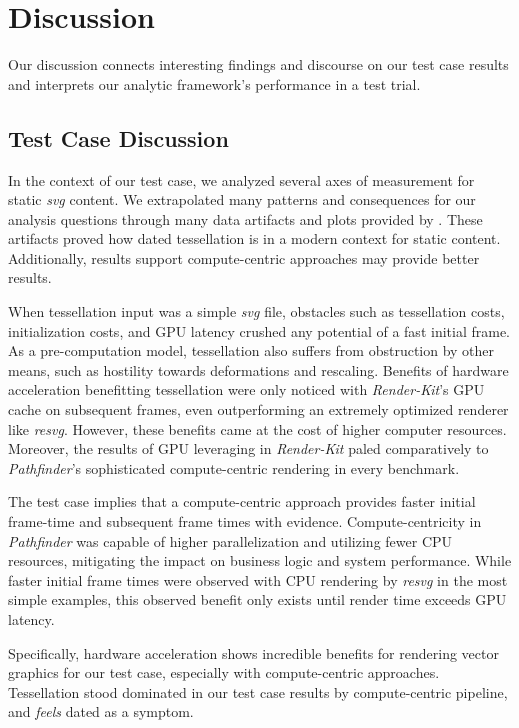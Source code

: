\section{Discussion}\label{sec:discussion}
Our discussion connects interesting findings and discourse on our test case results and interprets our analytic framework's performance in a test trial.

\subsection{Test Case Discussion}
In the context of our test case, we analyzed several axes of measurement for static \textit{svg} content. We extrapolated many patterns and consequences for our analysis questions through many data artifacts and plots provided by \toollinkedname. These artifacts proved how dated tessellation is in a modern context for static content. Additionally, results support compute-centric approaches may provide better results.\medskip

When tessellation input was a simple \textit{svg} file, obstacles such as tessellation costs, initialization costs, and GPU latency crushed any potential of a fast initial frame. As a pre-computation model, tessellation also suffers from obstruction by other means, such as hostility towards deformations and rescaling. Benefits of hardware acceleration benefitting tessellation were only noticed with \textit{Render-Kit}'s GPU cache on subsequent frames, even outperforming an extremely optimized renderer like \textit{resvg}. However, these benefits came at the cost of higher computer resources. Moreover, the results of GPU leveraging in \textit{Render-Kit} paled comparatively to \textit{Pathfinder}'s sophisticated compute-centric rendering in every benchmark.\medskip

The test case implies that a compute-centric approach provides faster initial frame-time and subsequent frame times with evidence. Compute-centricity in \textit{Pathfinder} was capable of higher parallelization and utilizing fewer CPU resources, mitigating the impact on business logic and system performance. While faster initial frame times were observed with CPU rendering by \textit{resvg} in the most simple examples, this observed benefit only exists until render time exceeds GPU latency.\medskip

Specifically, hardware acceleration shows incredible benefits for rendering vector graphics for our test case, especially with compute-centric approaches. Tessellation stood dominated in our test case results by compute-centric pipeline, and \emph{feels} dated as a symptom.

